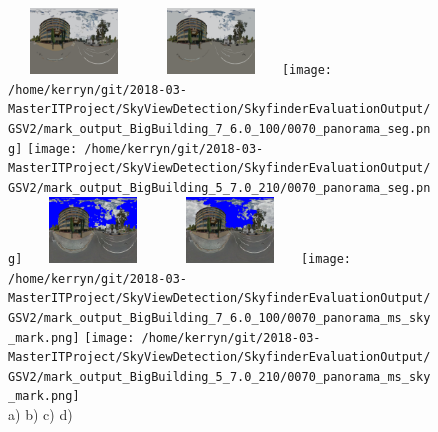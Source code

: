 \documentclass{article}
\begin{document}
\begin{figure}
\centering  
{}\includegraphics[width=3.50cm,height=1.75cm]{Images/mean/4880_7_6_100.png} 
\includegraphics[width=3.50cm,height=1.75cm]{Images/mean/4880_5_7_210.png} 
\texttt{[image: /home/kerryn/git/2018-03-MasterITProject/SkyViewDetection/SkyfinderEvaluationOutput/GSV2/mark\_output\_BigBuilding\_7\_6.0\_100/0070\_panorama\_seg.png]} 
\texttt{[image: /home/kerryn/git/2018-03-MasterITProject/SkyViewDetection/SkyfinderEvaluationOutput/GSV2/mark\_output\_BigBuilding\_5\_7.0\_210/0070\_panorama\_seg.png]} 
\includegraphics[width=3.50cm,height=1.75cm]{Images/mean/4880_7_6_100_ms_sky_mark.png} 
\includegraphics[width=3.50cm,height=1.75cm]{Images/mean/4880_5_7_210_ms_sky_mark.png} 
\texttt{[image: /home/kerryn/git/2018-03-MasterITProject/SkyViewDetection/SkyfinderEvaluationOutput/GSV2/mark\_output\_BigBuilding\_7\_6.0\_100/0070\_panorama\_ms\_sky\_mark.png]} 
\texttt{[image: /home/kerryn/git/2018-03-MasterITProject/SkyViewDetection/SkyfinderEvaluationOutput/GSV2/mark\_output\_BigBuilding\_5\_7.0\_210/0070\_panorama\_ms\_sky\_mark.png]} 
\\
\scriptsize{a)}\hfil
\scriptsize{b)}\hfil
\scriptsize{c)}\hfil
\scriptsize{d)}\hfil

\end{figure} 
\end{document}
